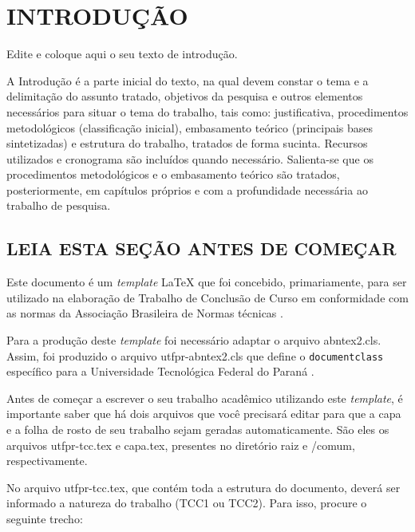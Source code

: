 
\chapter{INTRODUÇÃO}
\label{chap:introducao}

Edite e coloque aqui o seu texto de introdução.

A Introdução é a parte inicial do texto, na qual devem constar o tema e a delimitação do assunto tratado, objetivos da pesquisa e outros elementos necessários para situar o tema do trabalho, tais como: justificativa, procedimentos metodológicos (classificação inicial), embasamento teórico (principais bases sintetizadas) e estrutura do trabalho, tratados de forma sucinta. Recursos utilizados e cronograma são incluídos quando necessário. Salienta-se que os procedimentos metodológicos e o embasamento teórico são tratados, posteriormente, em capítulos próprios e com a profundidade necessária ao trabalho de pesquisa.

\section{LEIA ESTA SEÇÃO ANTES DE COMEÇAR}
\label{sec:antesleiame}

Este documento é um \emph{template} \LaTeX{} que foi concebido, primariamente, para ser utilizado na elaboração de Trabalho de Conclusão de Curso  em conformidade com as normas da Associação Brasileira de Normas técnicas .

Para a produção deste \emph{template} foi necessário adaptar o arquivo {\ttfamily abntex2.cls}. Assim, foi produzido o arquivo {\ttfamily utfpr-abntex2.cls} que define o \verb|documentclass| específico para a Universidade Tecnológica Federal do Paraná .

Antes de começar a escrever o seu trabalho acadêmico utilizando este \emph{template}, é importante saber que há dois arquivos que você precisará editar para que a capa e a folha de rosto de seu trabalho sejam geradas automaticamente.
São eles os arquivos {\ttfamily utfpr-tcc.tex} e {\ttfamily capa.tex}, presentes no diretório raiz e {\ttfamily /comum}, respectivamente. 

No arquivo {\ttfamily utfpr-tcc.tex}, que contém toda a estrutura do documento, deverá ser informado a natureza do trabalho (TCC1 ou TCC2). Para isso, procure o seguinte trecho:

